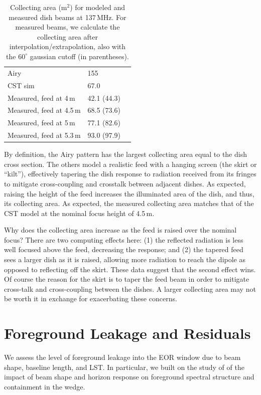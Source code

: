 \documentclass[preprint]{aastex}
\begin{document}
 \begin{table}[h]
 \caption{ \label{table:collectingareatable}Collecting area (m$^2$) for modeled and measured dish beams at 137\,MHz. For measured beams, we calculate the collecting area after interpolation/extrapolation, also with the $60^\circ$ gaussian cutoff (in parentheses).}
\begin{tabular}{| l | l | l |}
\hline
  Airy & 155\,  \\
  CST sim & 67.0\,  \\
  \hline
  Measured, feed at 4\,m & 42.1 (44.3) \\
  Measured, feed at 4.5\,m & 68.5 (73.6) \\ 
  Measured, feed at 5\,m & 77.1 (82.6) \\
  Measured, feed at 5.3\,m & 93.0 (97.9)\\
  \hline
\end{tabular}
\end{table}

By definition, the Airy pattern has the largest collecting area equal to the dish cross section. The others model a realistic feed with a hanging screen (the skirt or ``kilt''), effectively tapering the dish response to radiation received from its fringes to mitigate cross-coupling and crosstalk between adjacent dishes. As expected, raising the height of the feed increases the illuminated area of the dish, and thus, its collecting area. As expected, the measured collecting area matches that of the CST model at the nominal focus height of 4.5\,m.

Why does the collecting area increase as the feed is raised over the nominal focus? There are two computing effects here: (1) the reflected radiation is less well focused above the feed, decreasing the response; and (2) the tapered feed sees a larger dish as it is raised, allowing more radiation to reach the dipole as opposed to reflecting off the skirt. These data suggest that the second effect wins. Of course the reason for the skirt is to taper the feed beam in order to mitigate cross-talk and cross-coupling between the dishes. A larger collecting area may not be worth it in exchange for exacerbating these concerns.

\section{Foreground Leakage and Residuals}
\label{sec:foregroundleakage}

We assess the level of foreground leakage into the EOR window due to beam shape, baseline length, and LST. In particular, we built on the study of \citet{nithya15} of the impact of beam shape and horizon response on foreground spectral structure and containment in the wedge.
\end{document}
